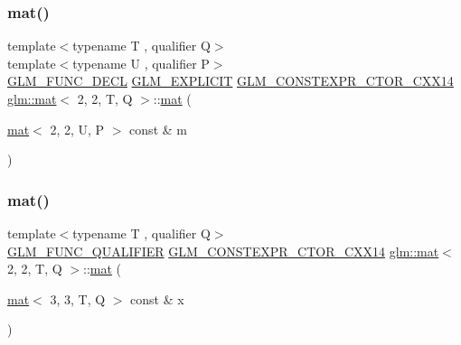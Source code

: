 \mbox{\label{structglm_1_1mat_3_012_00_012_00_01_t_00_01_q_01_4_a5957fcd6239f1897d7538031ce3b2f0d}} 
\subsubsection{\texorpdfstring{mat()}{mat()}\hspace{0.1cm}{\footnotesize\ttfamily [9/21]}}
{\footnotesize\ttfamily template$<$typename T , qualifier Q$>$ \\
template$<$typename U , qualifier P$>$ \\
\mbox{\hyperlink{setup_8hpp_ab2d052de21a70539923e9bcbf6e83a51}{G\+L\+M\+\_\+\+F\+U\+N\+C\+\_\+\+D\+E\+CL}} \mbox{\hyperlink{setup_8hpp_a6c74f5a5e7b134ab69023ff9a30d4d5d}{G\+L\+M\+\_\+\+E\+X\+P\+L\+I\+C\+IT}} \mbox{\hyperlink{setup_8hpp_a0900f9145e68bf6061b6f5e7be3fa751}{G\+L\+M\+\_\+\+C\+O\+N\+S\+T\+E\+X\+P\+R\+\_\+\+C\+T\+O\+R\+\_\+\+C\+X\+X14}} \mbox{\hyperlink{structglm_1_1mat}{glm\+::mat}}$<$ 2, 2, T, Q $>$\+::\mbox{\hyperlink{structglm_1_1mat}{mat}} (\begin{DoxyParamCaption}\item[{\mbox{\hyperlink{structglm_1_1mat}{mat}}$<$ 2, 2, U, P $>$ const \&}]{m }\end{DoxyParamCaption})}

\mbox{\label{structglm_1_1mat_3_012_00_012_00_01_t_00_01_q_01_4_a682cca2c732533360d904d912f4c69e8}} 
\subsubsection{\texorpdfstring{mat()}{mat()}\hspace{0.1cm}{\footnotesize\ttfamily [10/21]}}
{\footnotesize\ttfamily template$<$typename T , qualifier Q$>$ \\
\mbox{\hyperlink{setup_8hpp_a33fdea6f91c5f834105f7415e2a64407}{G\+L\+M\+\_\+\+F\+U\+N\+C\+\_\+\+Q\+U\+A\+L\+I\+F\+I\+ER}} \mbox{\hyperlink{setup_8hpp_a0900f9145e68bf6061b6f5e7be3fa751}{G\+L\+M\+\_\+\+C\+O\+N\+S\+T\+E\+X\+P\+R\+\_\+\+C\+T\+O\+R\+\_\+\+C\+X\+X14}} \mbox{\hyperlink{structglm_1_1mat}{glm\+::mat}}$<$ 2, 2, T, Q $>$\+::\mbox{\hyperlink{structglm_1_1mat}{mat}} (\begin{DoxyParamCaption}\item[{\mbox{\hyperlink{structglm_1_1mat}{mat}}$<$ 3, 3, T, Q $>$ const \&}]{x }\end{DoxyParamCaption})}

